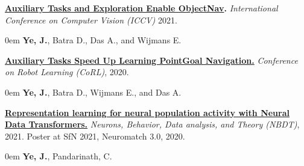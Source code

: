     \textbf{\href{https://joel99.github.io/objectnav/}{Auxiliary Tasks and Exploration Enable ObjectNav}.}
    \emph{International Conference on Computer Vision (ICCV)} 2021.

    \begin{addmargin}[1em]{0em}%
        \textbf{Ye, J.}, Batra D., Das A., and Wijmans E.
    \end{addmargin}

    \textbf{
        \href{https://arxiv.org/abs/2007.04561}
        {Auxiliary Tasks Speed Up Learning PointGoal Navigation.}
    } \emph{Conference on Robot Learning (CoRL)}, 2020.
    \begin{addmargin}[1em]{0em}%
        \textbf{Ye, J.}, Batra D., Wijmans E., and Das A.
    \end{addmargin}

    \textbf{\href{https://arxiv.org/abs/2108.01210}
    {Representation learning for neural population activity with Neural Data Transformers.}}
    \emph{Neurons, Behavior, Data analysis, and Theory (NBDT)}, 2021. Poster at SfN 2021, Neuromatch 3.0, 2020.
    \begin{addmargin}[1em]{0em}
        \textbf{Ye, J.}, Pandarinath, C.
    \end{addmargin}


